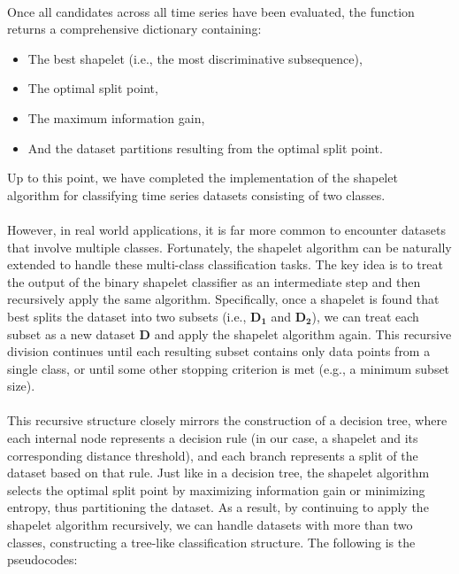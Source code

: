\\
Once all candidates across all time series have been evaluated, the function returns a comprehensive dictionary containing:
\begin{itemize}
	\item The best shapelet (i.e., the most discriminative subsequence),
	\item The optimal split point,
	\item The maximum information gain,
	\item And the dataset partitions resulting from the optimal split point.
\end{itemize}
\noindent Up to this point, we have completed the implementation of the shapelet algorithm for classifying time series datasets consisting of two classes.\\
\\
However, in real world applications, it is far more common to encounter datasets that involve multiple classes. Fortunately, the shapelet algorithm can be naturally extended to handle these multi-class classification tasks. The key idea is to treat the output of the binary shapelet classifier as an intermediate step and then recursively apply the same algorithm. Specifically, once a shapelet is found that best splits the dataset into two subsets (i.e., $\boldsymbol{D_1}$ and $\boldsymbol{D_2}$), we can treat each subset as a new dataset $\boldsymbol{D}$ and apply the shapelet algorithm again. This recursive division continues until each resulting subset contains only data points from a single class, or until some other stopping criterion is met (e.g., a minimum subset size).\\
\\
This recursive structure closely mirrors the construction of a decision tree, where each internal node represents a decision rule (in our case, a shapelet and its corresponding distance threshold), and each branch represents a split of the dataset based on that rule. Just like in a decision tree, the shapelet algorithm selects the optimal split point by maximizing information gain or minimizing entropy, thus partitioning the dataset. As a result, by continuing to apply the shapelet algorithm recursively, we can handle datasets with more than two classes, constructing a tree-like classification structure. The following is the pseudocodes:
